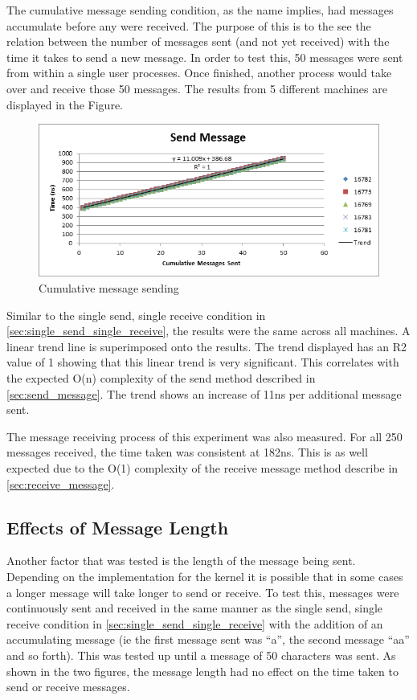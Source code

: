 \documentclass[12pt]{report}
\begin{document}
The cumulative message sending condition, as the name implies, had messages accumulate before any were received. The purpose of this is to the see the relation between the number of messages sent (and not yet received) with the time it takes to send a new message. In order to test this, 50 messages were sent from within a single user processes. Once finished, another process would take over and receive those 50 messages. The results from 5 different machines are displayed in the Figure.
\begin{figure}[h!]
  \centering
    \includegraphics{SendMessage.png}
  \caption{Cumulative message sending}
\end{figure}

Similar to the single send, single receive condition in \ref{sec:single_send_single_receive}, the results were the same across all machines. A linear trend line is superimposed onto the results. The trend displayed has an R2 value of 1 showing that this linear trend is very significant. This correlates with the expected O(n) complexity of the send method described in \ref{sec:send_message}. The trend shows an increase of 11ns per additional message sent.

The message receiving process of this experiment was also measured. For all 250 messages received, the time taken was consistent at 182ns. This is as well expected due to the O(1) complexity of the receive message method describe in \ref{sec:receive_message}.

\subsection{Effects of Message Length}
\label{sec:message_length}
Another factor that was tested is the length of the message being sent. Depending on the implementation for the kernel it is possible that in some cases a longer message will take longer to send or receive. To test this, messages were continuously sent and received in the same manner as the single send, single receive condition in \ref{sec:single_send_single_receive} with the addition of an accumulating message (ie the first message sent was “a”, the second message “aa” and so forth).  This was tested up until a message of 50 characters was sent. As shown in the two figures, the message length had no effect on the time taken to send or receive messages.
\end{document}
